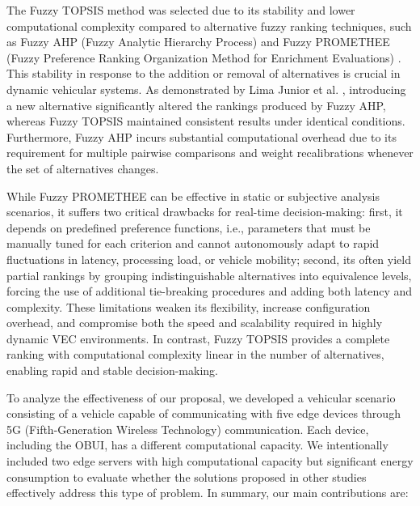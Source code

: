 \documentclass[iicol]{sn-jnl}
\begin{document}
The Fuzzy TOPSIS method was selected due to its stability and lower computational complexity \cite{adali_alternative_2016} compared to alternative fuzzy ranking techniques, such as Fuzzy AHP (Fuzzy Analytic Hierarchy Process) \cite{chang_applications_1996} and Fuzzy PROMETHEE (Fuzzy Preference Ranking Organization Method for Enrichment Evaluations) \cite{adali_alternative_2016}. This stability in response to the addition or removal of alternatives is crucial in dynamic vehicular systems. As demonstrated by Lima Junior et al. \cite{lima_junior_comparison_2014}, introducing a new alternative significantly altered the rankings produced by Fuzzy AHP, whereas Fuzzy TOPSIS maintained consistent results under identical conditions. Furthermore, Fuzzy AHP incurs substantial computational overhead due to its requirement for multiple pairwise comparisons and weight recalibrations whenever the set of alternatives changes. 

While Fuzzy PROMETHEE can be effective in static or subjective analysis scenarios, it suffers two critical drawbacks for real-time decision-making: first, it depends on predefined preference functions, i.e., parameters that must be manually tuned for each criterion and cannot autonomously adapt to rapid fluctuations in latency, processing load, or vehicle mobility; second, its often yield partial rankings by grouping indistinguishable alternatives into equivalence levels, forcing the use of additional tie-breaking procedures and adding both latency and complexity. These limitations weaken its flexibility, increase configuration overhead, and compromise both the speed and scalability required in highly dynamic VEC environments. In contrast, Fuzzy TOPSIS provides a complete ranking with computational complexity linear in the number of alternatives, enabling rapid and stable decision-making.

To analyze the effectiveness of our proposal, we developed a vehicular scenario consisting of a vehicle capable of communicating with five edge devices through 5G (Fifth-Generation Wireless Technology) communication. Each device, including the OBUI, has a different computational capacity. We intentionally included two edge servers with high computational capacity but significant energy consumption to evaluate whether the solutions proposed in other studies effectively address this type of problem. In summary, our main contributions are:
\end{document}
